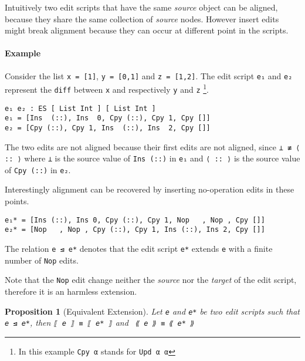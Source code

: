 \documentclass[preprint]{sigplanconf}
\theoremstyle{plain}
\newtheorem{prop}{Proposition}
\begin{document}
        Intuitively two edit scripts that have the same \emph{source}
        object can be aligned, because they share the same collection
        of \emph{source} nodes.
        However insert edits might break alignment because they can
        occur at different point in the scripts.

        \paragraph{Example}
        Consider the list \texttt{x = [1]}, \texttt{y = [0,1]} and \texttt{z = [1,2]}.
        The edit script \texttt{e₁} and \texttt{e₂} represent the \texttt{diff} between \texttt{x} and
        respectively \texttt{y} and \texttt{z} \footnote{In this example \texttt{Cpy α} stands for \texttt{Upd α α}}.

\begin{verbatim}
e₁ e₂ : ES [ List Int ] [ List Int ]
e₁ = [Ins  (::), Ins  0, Cpy (::), Cpy 1, Cpy []]
e₂ = [Cpy (::), Cpy 1, Ins  (::), Ins  2, Cpy []] 
\end{verbatim}       

        The two edits are not aligned because their first edits are not aligned, since \texttt{⊥ ≢ ⟨ :: ⟩}
        where \texttt{⊥} is the source value of \texttt{Ins (::)} in \texttt{e₁} and \texttt{⟨ :: ⟩} is
        the source value of \texttt{Cpy (::)} in \texttt{e₂}.

        Interestingly alignment can be recovered by inserting no-operation edits in 
        these points. 
\begin{verbatim}
e₁* = [Ins (::), Ins 0, Cpy (::), Cpy 1, Nop   , Nop , Cpy []]
e₂* = [Nop   , Nop , Cpy (::), Cpy 1, Ins (::), Ins 2, Cpy []] 
\end{verbatim}
        The relation \texttt{e ⊴ e*} denotes that the edit script
        \texttt{e*} extends \texttt{e} with a finite number of
        \texttt{Nop} edits.

        Note that the \texttt{Nop} edit change neither the
        \emph{source} nor the \emph{target} of the edit script,
        therefore it is an harmless extension.
        
\begin{prop}[Equivalent Extension]
Let \texttt{e} and \texttt{e*} be two edit scripts such that \texttt{e ⊴ e*}, then
\texttt{⟦ e ⟧ ≡ ⟦ e* ⟧} and \texttt{ ⟪ e ⟫ ≡ ⟪ e* ⟫}
\end{prop}
\end{document}
